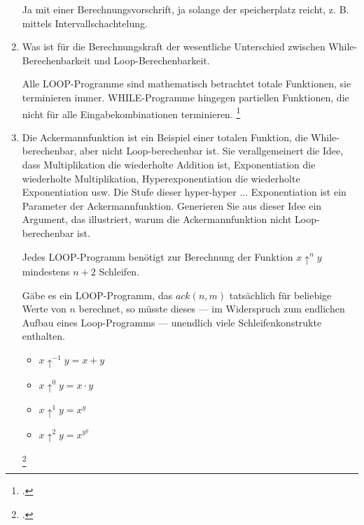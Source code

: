 \documentclass{lehramt-informatik-aufgabe}
\begin{document}
\begin{enumerate}
\begin{liAntwort}
Ja mit einer Berechnungsvorschrift, ja solange der speicherplatz reicht,
z. B. mittels Intervallschachtelung.
\end{liAntwort}


\item Was ist für die Berechnungskraft der wesentliche Unterschied
zwischen While-Berechenbarkeit und Loop-Berechenbarkeit.

\begin{liAntwort}
Alle LOOP-Programme sind mathematisch betrachtet totale Funktionen,
\dh sie terminieren immer. WHILE-Programme hingegen partiellen
Funktionen, die nicht für alle Eingabekombinationen terminieren.
\footcite[Seite 258-259]{hoffmann}
\end{liAntwort}



\item Die Ackermannfunktion ist ein Beispiel einer totalen Funktion, die
While-berechenbar, aber nicht Loop-berechenbar ist. Sie verallgemeinert
die Idee, dass Multiplikation die wiederholte Addition ist,
Exponentiation die wiederholte Multiplikation, Hyperexponentiation die
wiederholte Exponentiation usw. Die Stufe dieser hyper-hyper ...
Exponentiation ist ein Parameter der Ackermannfunktion. Generieren Sie
aus dieser Idee ein Argument, das illustriert, warum die
Ackermannfunktion nicht Loop-berechenbar ist.

\begin{liAntwort}
Jedes LOOP-Programm benötigt zur Berechnung der Funktion $x \uparrow^n
y$ mindestens $n + 2$ Schleifen.

Gäbe es ein LOOP-Programm, das $ack(n,
m)$ tatsächlich für beliebige Werte von $n$ berechnet, so müsste dieses
--- im Widerspruch zum endlichen Aufbau eines Loop-Programms ---
unendlich viele Schleifenkonstrukte enthalten.


\begin{itemize}
\item $x \uparrow^{-1} y = x + y$
\item $x \uparrow^0 y = x \cdot y$
\item $x \uparrow^1 y = x^y$
\item $x \uparrow^2 y = x^{y^y}$

\end{itemize}
\footcite[Seite 258]{hoffmann}
\end{liAntwort}


\end{enumerate}
\end{document}
